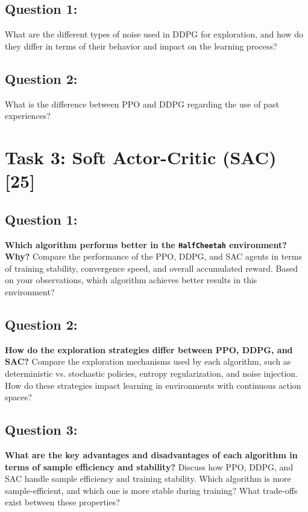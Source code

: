 \documentclass[12pt]{article}
\begin{document}
{{{\subsection{Question 1:}

What are the different types of noise used in DDPG for exploration, and how do they differ in terms of their behavior and impact on the learning process?

\vspace*{0.3cm}

\subsection{Question 2:}

What is the difference between PPO and DDPG regarding the use of past experiences?

\newpage

\section{Task 3: Soft Actor-Critic (SAC) [25]}

\subsection{Question 1:}
\textbf{Which algorithm performs better in the \texttt{HalfCheetah} environment? Why?}
\newline
Compare the performance of the PPO, DDPG, and SAC agents in terms of training stability, convergence speed, and overall accumulated reward. Based on your observations, which algorithm achieves better results in this environment?


\vspace*{0.3cm}

\subsection{Question 2:}
\textbf{How do the exploration strategies differ between PPO, DDPG, and SAC?}
\newline
Compare the exploration mechanisms used by each algorithm, such as deterministic vs. stochastic policies, entropy regularization, and noise injection. How do these strategies impact learning in environments with continuous action spaces?
\vspace*{0.3cm}

\subsection{Question 3:}
\textbf{What are the key advantages and disadvantages of each algorithm in terms of sample efficiency and stability?}
\newline
Discuss how PPO, DDPG, and SAC handle sample efficiency and training stability. Which algorithm is more sample-efficient, and which one is more stable during training? What trade-offs exist between these properties?

}}}
\end{document}
